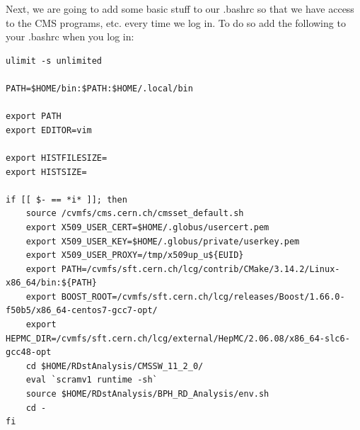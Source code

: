 \documentclass[12pt]{report}
\begin{document}
Next, we are going to add some basic stuff to our .bashrc so that we have
access to the CMS programs, etc. every time we log in. To do so add the
following to your .bashrc when you log in:

\begin{mdframed}[backgroundcolor=light-gray, roundcorner=10pt,leftmargin=1, rightmargin=1, innerleftmargin=15, innertopmargin=15,innerbottommargin=15, outerlinewidth=1, linecolor=light-gray,roundcorner=20pt]
\begin{lstlisting}
ulimit -s unlimited

PATH=$HOME/bin:$PATH:$HOME/.local/bin

export PATH
export EDITOR=vim

export HISTFILESIZE=
export HISTSIZE=

if [[ $- == *i* ]]; then
    source /cvmfs/cms.cern.ch/cmsset_default.sh
    export X509_USER_CERT=$HOME/.globus/usercert.pem
    export X509_USER_KEY=$HOME/.globus/private/userkey.pem
    export X509_USER_PROXY=/tmp/x509up_u${EUID}
    export PATH=/cvmfs/sft.cern.ch/lcg/contrib/CMake/3.14.2/Linux-x86_64/bin:${PATH}
    export BOOST_ROOT=/cvmfs/sft.cern.ch/lcg/releases/Boost/1.66.0-f50b5/x86_64-centos7-gcc7-opt/
    export HEPMC_DIR=/cvmfs/sft.cern.ch/lcg/external/HepMC/2.06.08/x86_64-slc6-gcc48-opt
    cd $HOME/RDstAnalysis/CMSSW_11_2_0/
    eval `scramv1 runtime -sh`
    source $HOME/RDstAnalysis/BPH_RD_Analysis/env.sh
    cd -
fi

\end{lstlisting}
\end{mdframed}
\end{document}
